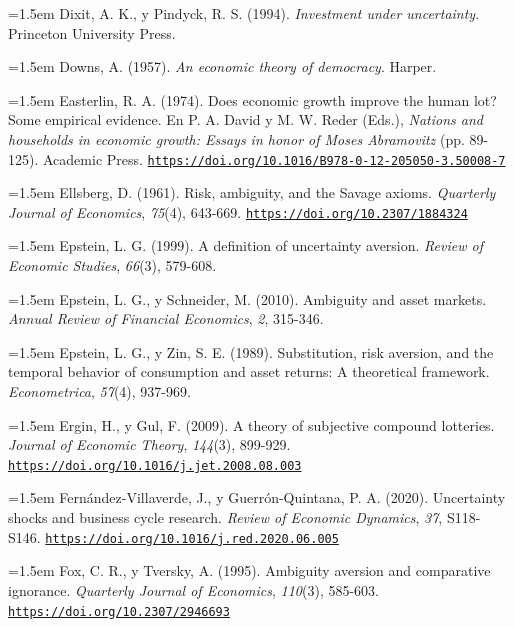 \documentclass[10pt,a4paper]{article}
\begin{document}
\noindent\hangindent=1.5em Dixit, A. K., y Pindyck, R. S. (1994). \textit{Investment under uncertainty}. Princeton University Press.

\noindent\hangindent=1.5em Downs, A. (1957). \textit{An economic theory of democracy}. Harper.

\noindent\hangindent=1.5em Easterlin, R. A. (1974). Does economic growth improve the human lot? Some empirical evidence. En P. A. David y M. W. Reder (Eds.), \textit{Nations and households in economic growth: Essays in honor of Moses Abramovitz} (pp. 89-125). Academic Press. \href{https://doi.org/10.1016/B978-0-12-205050-3.50008-7}{\nolinkurl{https://doi.org/10.1016/B978-0-12-205050-3.50008-7}}

\noindent\hangindent=1.5em Ellsberg, D. (1961). Risk, ambiguity, and the Savage axioms. \textit{Quarterly Journal of Economics}, \textit{75}(4), 643-669. \href{https://doi.org/10.2307/1884324}{\nolinkurl{https://doi.org/10.2307/1884324}}

\noindent\hangindent=1.5em Epstein, L. G. (1999). A definition of uncertainty aversion. \textit{Review of Economic Studies}, \textit{66}(3), 579-608.

\noindent\hangindent=1.5em Epstein, L. G., y Schneider, M. (2010). Ambiguity and asset markets. \textit{Annual Review of Financial Economics}, \textit{2}, 315-346.

\noindent\hangindent=1.5em Epstein, L. G., y Zin, S. E. (1989). Substitution, risk aversion, and the temporal behavior of consumption and asset returns: A theoretical framework. \textit{Econometrica}, \textit{57}(4), 937-969.

\noindent\hangindent=1.5em Ergin, H., y Gul, F. (2009). A theory of subjective compound lotteries. \textit{Journal of Economic Theory}, \textit{144}(3), 899-929. \href{https://doi.org/10.1016/j.jet.2008.08.003}{\nolinkurl{https://doi.org/10.1016/j.jet.2008.08.003}}

\noindent\hangindent=1.5em Fernández-Villaverde, J., y Guerrón-Quintana, P. A. (2020). Uncertainty shocks and business cycle research. \textit{Review of Economic Dynamics}, \textit{37}, S118-S146. \href{https://doi.org/10.1016/j.red.2020.06.005}{\nolinkurl{https://doi.org/10.1016/j.red.2020.06.005}}

\noindent\hangindent=1.5em Fox, C. R., y Tversky, A. (1995). Ambiguity aversion and comparative ignorance. \textit{Quarterly Journal of Economics}, \textit{110}(3), 585-603. \href{https://doi.org/10.2307/2946693}{\nolinkurl{https://doi.org/10.2307/2946693}}
\end{document}
